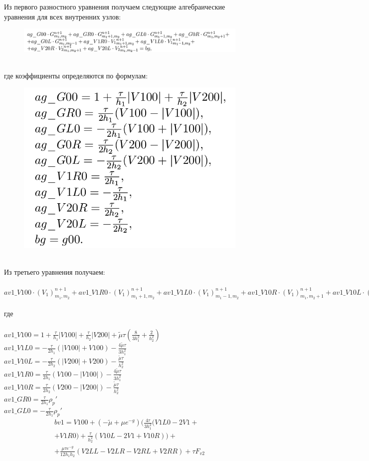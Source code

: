 Из первого разностного уравнения получаем следующие алгебраические уравнения для всех внутренних узлов:
\begin{figure}[h!]
{\includegraphics[width=0.93\linewidth]{./images/6.png}}
\end{figure} \\
где коэффициенты определяются по формулам:
\begin{figure}[h!]
{\includegraphics[width=0.38\linewidth]{./images/20.png}}
\end{figure} \\
Из третьего уравнения получаем: \\ \\
$ av1\_V100 \cdot (V_1)_{m_1,m_2}^{n+1} + av1\_V1R0 \cdot (V_1)_{m_1+1,m_2}^{n+1}
+ av1\_V1L0 \cdot (V_1)_{m_1-1,m_2}^{n+1} + av1\_V10R \cdot (V_1)_{m_1,m_2+1}^{n+1}
+ av1\_V10L \cdot (V_1)_{m_1,m_2-1}^{n+1} + av1\_GR0 \cdot G_{m_1 + 1,m_2}^{n+1}
+ av1\_GL0 * G_{m_1-1,m_2}^{n+1} = bv1,$ \\ \\
где \\ \\
$ av1\_V100 = 1 + \frac{\tau}{h_1}|V100| + \frac{\tau}{h_2}|V200| +  \tilde{\mu}\tau(\frac{8}{3h_1^2} + \frac{2}{h_2^2}) $ \\
$ av1\_V1L0 = -\frac{\tau}{2h_1}(|V100| + V100) - \frac{4\tilde \mu\tau}{3h_1^2} $ \\
$ av1\_V10L = -\frac{\tau}{2h_2}(|V200| + V200) - \frac{\tilde \mu\tau}  {h_2^2}  $ \\
$ av1\_V1R0 =  \frac{\tau}{2h_1}(V100 - |V100|) - \frac{4\tilde \mu\tau}{3h_1^2} $ \\
$ av1\_V10R =  \frac{\tau}{2h_2}(V200 - |V200|) - \frac{\tilde \mu\tau}  {h_2^2}  $ \\
$ av1\_GR0  =  \frac{\tau}{2h_1}\rho_p' $ \\
$ av1\_GL0  = -\frac{\tau}{2h_1}\rho_p' $
\begin{multline*}
bv1 = V100 + (-\tilde \mu + \mu e^{-g})(\frac{4\tau}{3h_1^2}(V1L0 - 2V1 + \\ +
  V1R0) + \frac{\tau}{h_2^2}(V10L - 2V1 + V10R)) +
  \\ + \frac{\mu\tau e^{-g}}{12h_1h_2}(V2LL - V2LR - V2RL + V2RR) + \tau F_{v2}
\end{multline*}
